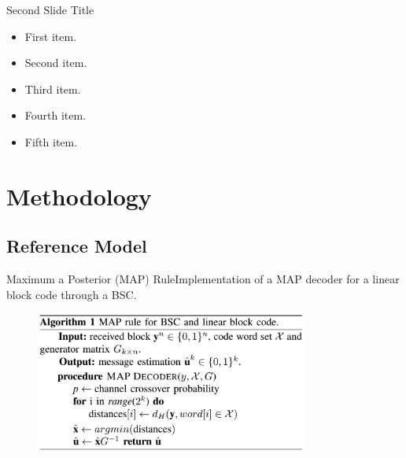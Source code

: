 \documentclass{beamer}
\begin{document}
\begin{frame}{Second Slide Title}
  \begin{itemize}
  \item {
    First item.
    \pause %
  }
  \item {   
    Second item.
  }
  \item<3-> {
    Third item.
  }
  \item<4-> {
    Fourth item.
  }
  \item<5-> {
    Fifth item. 
  }
  \end{itemize}
\end{frame}


\section{Methodology}

\subsection{Reference Model}
\begin{frame}{Maximum a Posterior (MAP) Rule}{Implementation of a MAP decoder for a linear block code through a BSC.}

 \begin{figure}[!ht]
  \centering
    \includegraphics[width=0.8\textwidth]{images/algorithm}
\end{figure}

\end{frame}
\end{document}
